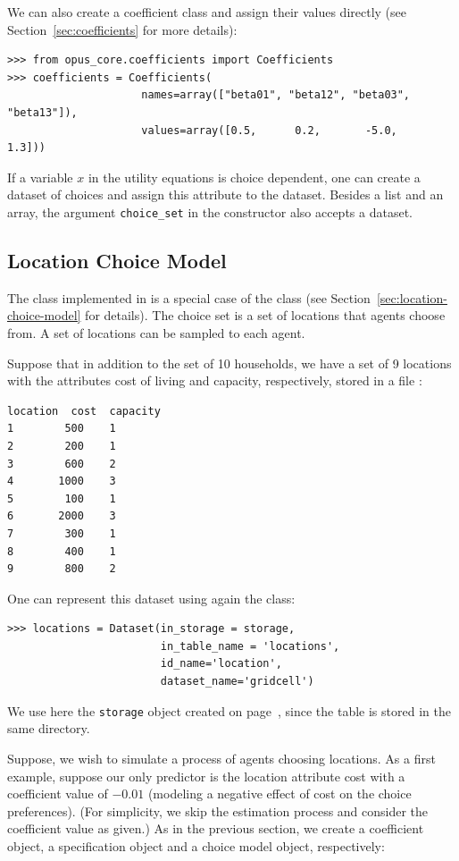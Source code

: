 We can also create a coefficient class and assign their values directly
(see Section~\ref{sec:coefficients} for more details):

\begin{verbatim}
>>> from opus_core.coefficients import Coefficients
>>> coefficients = Coefficients(
                     names=array(["beta01", "beta12", "beta03", "beta13"]),
                     values=array([0.5,      0.2,       -5.0,     1.3]))
\end{verbatim}

If a variable $x$ in the utility equations is choice dependent,
one can create a dataset of choices and assign this attribute to the
dataset. Besides a list and an array, the argument \verb|choice_set| in the
 constructor also accepts a dataset. 

%
\subsection{Location Choice Model}
%
\label{sec:LCM}
%
The  class implemented in  is a special case of the
 class (see Section~\ref{sec:location-choice-model} for details).
The choice set is a set of locations that agents choose
from. A set of locations can be sampled to each agent.

Suppose that in addition to the set of 10 households, we have a set of 9
locations with the attributes cost of living and capacity, respectively,
stored in a file :
\begin{verbatim}
location  cost  capacity
1        500    1
2        200    1
3        600    2
4       1000    3
5        100    1
6       2000    3
7        300    1
8        400    1
9        800    2
\end{verbatim}
One can represent this dataset using again the   class:
\label{page:tutorial-gc-locations}
\begin{verbatim}
>>> locations = Dataset(in_storage = storage,
                        in_table_name = 'locations', 
                        id_name='location',
                        dataset_name='gridcell')
\end{verbatim}
We use here the \verb|storage| object
created on page~\pageref{storagepage}, since the table is stored in the same directory.

Suppose, we wish to simulate a process of agents choosing locations.  As a
first example, suppose our only predictor is the location attribute cost with
a coefficient value of $-0.01$ (modeling a negative effect of cost on the
choice preferences). (For simplicity, we skip the estimation process and
consider the coefficient value as given.) As in the previous section, we
create a coefficient object, a specification object and a choice model object,
respectively:


